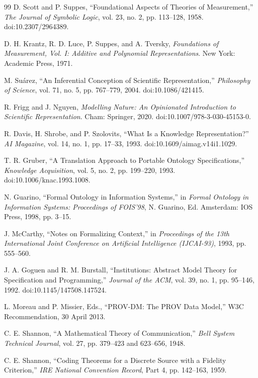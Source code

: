 \documentclass[11pt,a4paper]{article}
\begin{document}
\begin{thebibliography}{99}
D. Scott and P. Suppes, ``Foundational Aspects of Theories of Measurement,'' \emph{The Journal of Symbolic Logic}, vol. 23, no. 2, pp. 113--128, 1958. doi:10.2307/2964389.

D. H. Krantz, R. D. Luce, P. Suppes, and A. Tversky, \emph{Foundations of Measurement, Vol. I: Additive and Polynomial Representations}. New York: Academic Press, 1971.

M. Su\'arez, ``An Inferential Conception of Scientific Representation,'' \emph{Philosophy of Science}, vol. 71, no. 5, pp. 767--779, 2004. doi:10.1086/421415.

R. Frigg and J. Nguyen, \emph{Modelling Nature: An Opinionated Introduction to Scientific Representation}. Cham: Springer, 2020. doi:10.1007/978-3-030-45153-0.

R. Davis, H. Shrobe, and P. Szolovits, ``What Is a Knowledge Representation?'' \emph{AI Magazine}, vol. 14, no. 1, pp. 17--33, 1993. doi:10.1609/aimag.v14i1.1029.

T. R. Gruber, ``A Translation Approach to Portable Ontology Specifications,'' \emph{Knowledge Acquisition}, vol. 5, no. 2, pp. 199--220, 1993. doi:10.1006/knac.1993.1008.

N. Guarino, ``Formal Ontology in Information Systems,'' in \emph{Formal Ontology in Information Systems: Proceedings of FOIS'98}, N. Guarino, Ed. Amsterdam: IOS Press, 1998, pp. 3--15.

J. McCarthy, ``Notes on Formalizing Context,'' in \emph{Proceedings of the 13th International Joint Conference on Artificial Intelligence (IJCAI-93)}, 1993, pp. 555--560.

J. A. Goguen and R. M. Burstall, ``Institutions: Abstract Model Theory for Specification and Programming,'' \emph{Journal of the ACM}, vol. 39, no. 1, pp. 95--146, 1992. doi:10.1145/147508.147524.

L. Moreau and P. Missier, Eds., ``PROV-DM: The PROV Data Model,'' W3C Recommendation, 30 April 2013.

C. E. Shannon, ``A Mathematical Theory of Communication,'' \emph{Bell System Technical Journal}, vol. 27, pp. 379--423 and 623--656, 1948.

C. E. Shannon, ``Coding Theorems for a Discrete Source with a Fidelity Criterion,'' \emph{IRE National Convention Record}, Part 4, pp. 142--163, 1959.


\end{thebibliography}
\end{document}
